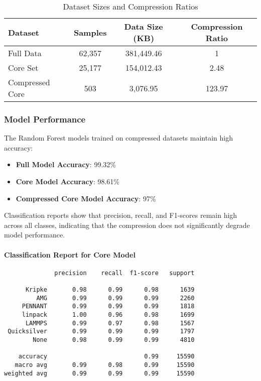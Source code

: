 \documentclass{article}
\begin{document}
\begin{table}[H]
\centering
\begin{tabular}{lccc}
\hline
\textbf{Dataset} & \textbf{Samples} & \textbf{Data Size (KB)} & \textbf{Compression Ratio} \\
\hline
Full Data & 62,357 & 381,449.46 & 1 \\
Core Set & 25,177 & 154,012.43 & 2.48 \\
Compressed Core & 503 & 3,076.95 & 123.97 \\
\hline
\end{tabular}
\caption{Dataset Sizes and Compression Ratios}
\end{table}

\subsubsection{Model Performance}

The Random Forest models trained on compressed datasets maintain high accuracy:

\begin{itemize}
    \item \textbf{Full Model Accuracy}: 99.32\%
    \item \textbf{Core Model Accuracy}: 98.61\%
    \item \textbf{Compressed Core Model Accuracy}: 97\%
\end{itemize}

Classification reports show that precision, recall, and F1-scores remain high across all classes, indicating that the compression does not significantly degrade model performance.

\paragraph{Classification Report for Core Model}

\begin{verbatim}
              precision    recall  f1-score   support

      Kripke       0.98      0.99      0.98      1639
         AMG       0.99      0.99      0.99      2260
     PENNANT       0.99      0.99      0.99      1818
     linpack       1.00      0.96      0.98      1699
      LAMMPS       0.99      0.97      0.98      1567
 Quicksilver       0.99      0.99      0.99      1797
        None       0.98      0.99      0.99      4810

    accuracy                           0.99     15590
   macro avg       0.99      0.98      0.99     15590
weighted avg       0.99      0.99      0.99     15590
\end{verbatim}
\end{document}
